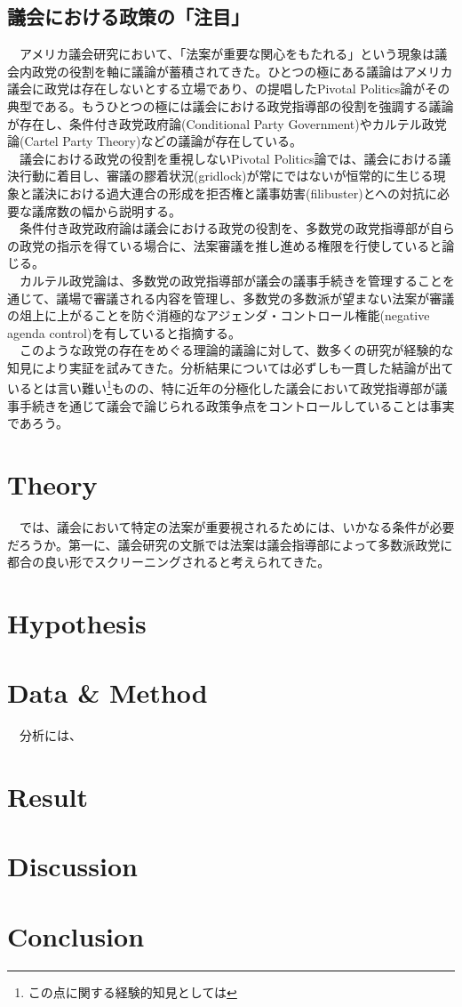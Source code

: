 \documentclass{article}
\begin{document}
\subsection{議会における政策の「注目」}
　アメリカ議会研究において、「法案が重要な関心をもたれる」という現象は議会内政党の役割を軸に議論が蓄積されてきた。ひとつの極にある議論はアメリカ議会に政党は存在しないとする立場であり、\citet*{Krehbiel2010-ob}の提唱したPivotal Politics論がその典型である。もうひとつの極には議会における政党指導部の役割を強調する議論が存在し、条件付き政党政府論(Conditional Party Government)\citep*{Rohde1991-da, Aldrich1995-xf}やカルテル政党論(Cartel Party Theory)\citep*{Cox2005-pn,Cox2007-xq}などの議論が存在している。\\
　議会における政党の役割を重視しないPivotal Politics論では、議会における議決行動に着目し、審議の膠着状況(gridlock)が常にではないが恒常的に生じる現象と議決における過大連合の形成を拒否権と議事妨害(filibuster)とへの対抗に必要な議席数の幅から説明する。\citep*{Krehbiel2010-ob}\\
　条件付き政党政府論は議会における政党の役割を、多数党の政党指導部が自らの政党の指示を得ている場合に、法案審議を推し進める権限を行使していると論じる。\\
　カルテル政党論は、多数党の政党指導部が議会の議事手続きを管理することを通じて、議場で審議される内容を管理し、多数党の多数派が望まない法案が審議の俎上に上がることを防ぐ消極的なアジェンダ・コントロール権能(negative agenda control)を有していると指摘する。\citep*{Cox2005-pn}\\
　このような政党の存在をめぐる理論的議論に対して、数多くの研究が経験的な知見により実証を試みてきた。分析結果については必ずしも一貫した結論が出ているとは言い難い\footnote{この点に関する経験的知見としては}ものの、特に近年の分極化した議会において政党指導部が議事手続きを通じて議会で論じられる政策争点をコントロールしていることは事実であろう。\citep*{Sinclair1997-jm, Sinclair2016-kh,Rosenthal2008-xb, Peters2010-ve}\\

\section*{Theory}
　では、議会において特定の法案が重要視されるためには、いかなる条件が必要だろうか。第一に、議会研究の文脈では法案は議会指導部によって多数派政党に都合の良い形でスクリーニングされると考えられてきた。
　

\section*{Hypothesis}

\section*{Data \& Method}
　分析には、

\section*{Result}

\section*{Discussion}

\section*{Conclusion}


\end{document}
